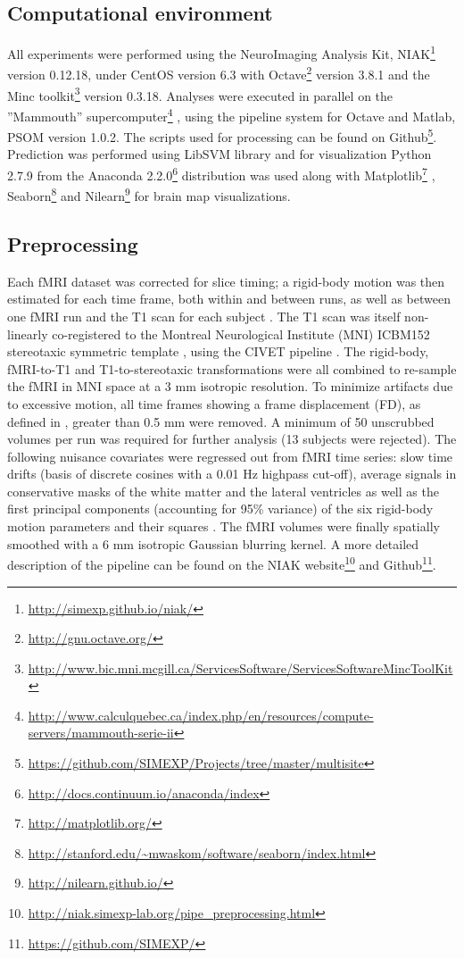 \documentclass[authoryear]{elsarticle}
\begin{document}
\subsection{Computational environment}
All experiments were performed using the NeuroImaging Analysis Kit, NIAK\footnote{\url{http://simexp.github.io/niak/}} \citep{Bellec2011} version 0.12.18, under CentOS version 6.3 with Octave\footnote{\url{http://gnu.octave.org/}} version 3.8.1 and the Minc toolkit\footnote{\url{http://www.bic.mni.mcgill.ca/ServicesSoftware/ServicesSoftwareMincToolKit}} version 0.3.18. Analyses were executed in parallel on the ”Mammouth” supercomputer\footnote{\url{http://www.calculquebec.ca/index.php/en/resources/compute-servers/mammouth-serie-ii}} , using the pipeline system for Octave and Matlab, PSOM \citep{Bellec2012} version 1.0.2. The scripts used for processing can be found on Github\footnote{\url{https://github.com/SIMEXP/Projects/tree/master/multisite}}. Prediction was performed using LibSVM library \citep{Chang2011} and for visualization Python 2.7.9 from the Anaconda 2.2.0\footnote{\url{http://docs.continuum.io/anaconda/index}} distribution was used along with Matplotlib\footnote{\url{http://matplotlib.org/}} \citep{matplotlib}, Seaborn\footnote{\url{http://stanford.edu/~mwaskom/software/seaborn/index.html}} and Nilearn\footnote{\url{http://nilearn.github.io/}} for brain map visualizations.

\subsection{Preprocessing}
Each fMRI dataset was corrected for slice timing; a rigid-body motion was then estimated for each time frame, both within and between runs, as well as between one fMRI run and the T1 scan for each subject \citep{Collins1994}. The T1 scan was itself non-linearly co-registered to the Montreal Neurological Institute (MNI) ICBM152 stereotaxic symmetric template \citep{Fonov2011}, using the CIVET pipeline \citep{Ad-Dab'bagh2006}. The rigid-body, fMRI-to-T1 and T1-to-stereotaxic transformations were all combined to re-sample the fMRI in MNI space at a 3 mm isotropic resolution. To minimize artifacts due to excessive motion, all time frames showing a frame displacement (FD), as defined in \cite{Power2012}, greater than 0.5 mm were removed. A minimum of 50 unscrubbed volumes per run was required for further analysis (13 subjects were rejected). The following nuisance covariates were regressed out from fMRI time series: slow time drifts (basis of discrete cosines with a 0.01 Hz highpass cut-off), average signals in conservative masks of the white matter and the lateral ventricles as well as the first principal components (accounting for 95\% variance) of the six rigid-body motion parameters and their squares \citep{Giove2009,Lund2006}. The fMRI volumes were finally spatially smoothed with a 6 mm isotropic Gaussian blurring kernel. A more detailed description of the pipeline can be found on the NIAK website\footnote{\url{http://niak.simexp-lab.org/pipe_preprocessing.html}} and Github\footnote{\url{https://github.com/SIMEXP/}}.
\end{document}
